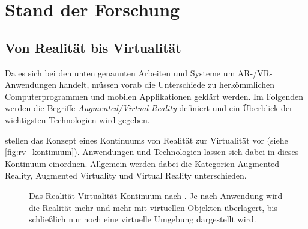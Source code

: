 \chapter{Stand der Forschung}
\label{chap:related_work}

\section{Von Realität bis Virtualität}
Da es sich bei den unten genannten Arbeiten und Systeme um AR-/VR-Anwendungen handelt, müssen vorab die Unterschiede zu herkömmlichen Computerprogrammen und mobilen Applikationen geklärt werden.
Im Folgenden werden die Begriffe \emph{Augmented/Virtual Reality} definiert und ein Überblick der wichtigsten Technologien wird gegeben.

\textcite{Milgram1994} stellen das Konzept eines Kontinuums von Realität zur Virtualität vor (siehe \autoref{fig:rv_kontinuum}).
Anwendungen und Technologien lassen sich dabei in dieses Kontinuum einordnen.
Allgemein werden dabei die Kategorien Augmented Reality, Augmented Virtuality und Virtual Reality unterschieden.

\begin{figure}[b]
	\centering
    \caption{Das Realität-Virtualität-Kontinuum nach \textcite{Milgram1994}. Je nach Anwendung wird die Realität mehr und mehr mit virtuellen Objekten überlagert, bis schließlich nur noch eine virtuelle Umgebung dargestellt wird.}
    \label{fig:rv_kontinuum}
\end{figure}

